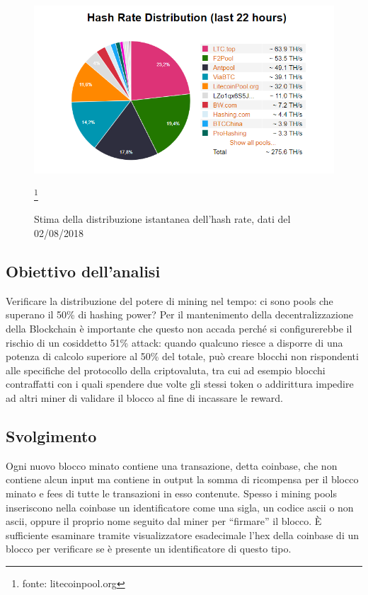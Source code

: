 \begin{figure}[h!]
	\centering
	\includegraphics[width=1.0\linewidth]{images/HashingPower020818}
	\caption{Stima della distribuzione istantanea dell'hash rate, dati del 02/08/2018}
	\label{fig:hashingpower020818}
	\footnote{fonte: litecoinpool.org}
\end{figure}


\subsection{Obiettivo dell’analisi}
Verificare la distribuzione del potere di mining nel tempo: ci sono pools che superano il 50\% di hashing power? Per il mantenimento della decentralizzazione della Blockchain è importante che questo non accada perché si configurerebbe il rischio di un cosiddetto 51\% attack: quando qualcuno riesce a disporre di una potenza di calcolo superiore al 50\% del totale, può creare blocchi non rispondenti alle specifiche del protocollo della criptovaluta, tra cui ad esempio blocchi contraffatti con i quali spendere due volte gli stessi token o addirittura impedire ad altri miner di validare il blocco al fine di incassare le reward.


\subsection{Svolgimento}
Ogni nuovo blocco minato contiene una transazione, detta coinbase, che non contiene alcun input ma contiene in output la somma di ricompensa per il blocco minato e fees di tutte le transazioni in esso contenute.
Spesso i mining pools inseriscono nella coinbase un identificatore come una sigla, un codice ascii o non ascii, oppure il proprio nome seguito dal miner per “firmare” il blocco. È sufficiente esaminare tramite visualizzatore esadecimale l’hex della coinbase di un blocco per verificare se è presente un identificatore di questo tipo.

